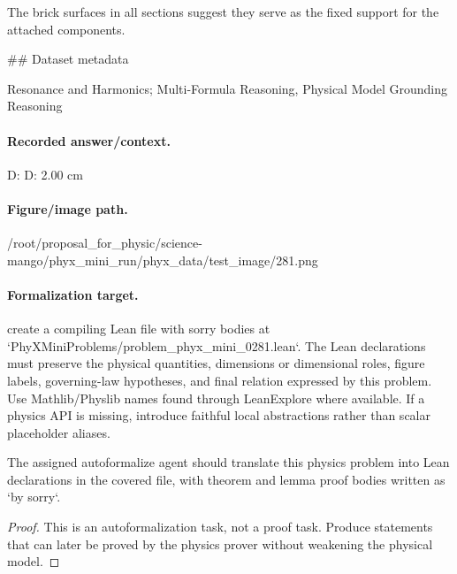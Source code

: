 The brick surfaces in all sections suggest they serve as the fixed support for the attached components.

\#\# Dataset metadata

Resonance and Harmonics; Multi-Formula Reasoning, Physical Model Grounding Reasoning

\paragraph{Recorded answer/context.}
D: D: 2.00 cm

\paragraph{Figure/image path.}
/root/proposal\_for\_physic/science-mango/phyx\_mini\_run/phyx\_data/test\_image/281.png

\paragraph{Formalization target.}
create a compiling Lean file with sorry bodies at `PhyXMiniProblems/problem\_phyx\_mini\_0281.lean`. The Lean declarations must preserve the physical quantities, dimensions or dimensional roles, figure labels, governing-law hypotheses, and final relation expressed by this problem.
Use Mathlib/Physlib names found through LeanExplore where available. If a physics API is missing, introduce faithful local abstractions rather than scalar placeholder aliases.

\begin{theorem}
\label{thm:physics:phyx_mini_0281:target}
The assigned autoformalize agent should translate this physics problem into Lean declarations in the covered file, with theorem and lemma proof bodies written as `by sorry`.
\end{theorem}
\begin{proof}
This is an autoformalization task, not a proof task. Produce statements that can later be proved by the physics prover without weakening the physical model.
\end{proof}

